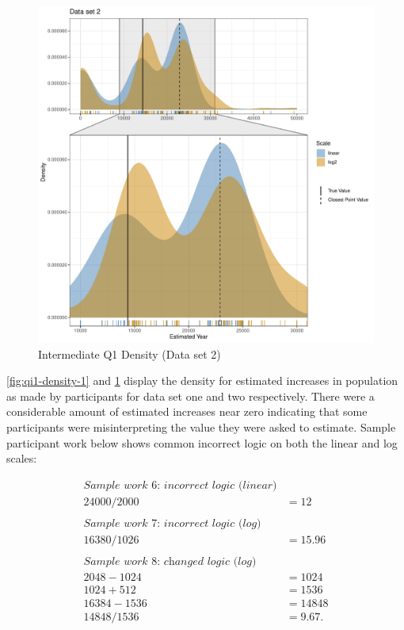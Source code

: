 \documentclass[print]{nuthesis}
\begin{document}
\begin{figure}[tbp]

{\centering \includegraphics[width=1\linewidth,]{thesis_files/figure-latex/qi1-density-2-1} 

}

\caption{Intermediate Q1 Density (Data set 2)}\label{fig:qi1-density-2}
\end{figure}

\cref{fig:qi1-density-1} and \cref{fig:qi1-density-2} display the density for estimated increases in population as made by participants for data set one and two respectively.
There were a considerable amount of estimated increases near zero indicating that some participants were misinterpreting the value they were asked to estimate.
Sample participant work below shows common incorrect logic on both the linear and log scales:

\begin{align}
\textit{Sample work 6: incorrect logic (linear)} \nonumber\\
24000/2000&=12 \nonumber\\
\nonumber \\ 
\textit{Sample work 7: incorrect logic (log)} \nonumber\\
16380/1026&=15.96\nonumber\\
\nonumber \\ 
\textit{Sample work 8: changed logic (log)} \nonumber\\
2048-1024&=1024\nonumber\\
1024+512&=1536\nonumber\\
16384-1536&=14848\nonumber\\
14848/1536&=9.67.\nonumber
\end{align}
\end{document}
